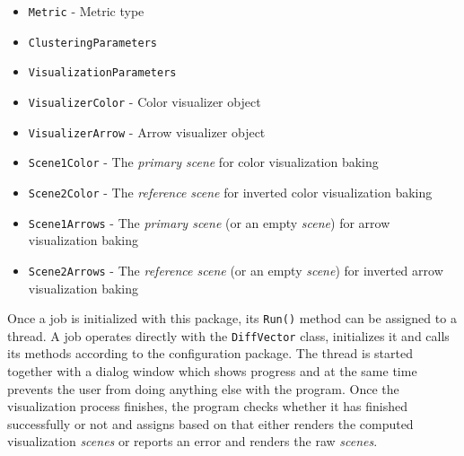 \begin{itemize}
\item \verb+Metric+ - Metric type
\item \verb+ClusteringParameters+
\item \verb+VisualizationParameters+
\item \verb+VisualizerColor+ - Color visualizer object
\item \verb+VisualizerArrow+ - Arrow visualizer object
\item \verb+Scene1Color+ - The {\it primary scene} for color visualization baking
\item \verb+Scene2Color+ - The {\it reference scene} for inverted color visualization baking
\item \verb+Scene1Arrows+ - The {\it primary scene} (or an empty {\it scene}) for arrow visualization baking
\item \verb+Scene2Arrows+ - The {\it reference scene} (or an empty {\it scene}) for inverted arrow visualization baking
\end{itemize}

Once a job is initialized with this package, its \verb+Run()+ method can be assigned to a thread. A job operates directly with the \verb+DiffVector+ class, initializes it and calls its methods according to the configuration package. The thread is started together with a dialog window which shows progress and at the same time prevents the user from doing anything else with the program. Once the visualization process finishes, the program checks whether it has finished successfully or not and assigns based on that either renders the computed visualization {\it scenes} or reports an error and renders the raw {\it scenes}.